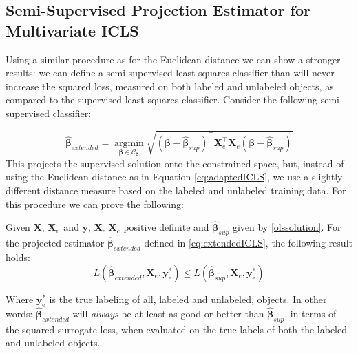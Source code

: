 \documentclass{llncs}
\newcommand{\Xe}{\mathbf{X}_e  }
\newcommand{\XeT}{\mathbf{X}_e^{\top}}
\begin{document}
\subsection{Semi-Supervised Projection Estimator for Multivariate ICLS}

Using a similar procedure as for the Euclidean distance we can show a stronger results: we can define a semi-supervised least squares classifier than will never increase the squared loss, measured on both labeled and unlabeled objects, as compared to the supervised least squares classifier. Consider the following semi-supervised classifier:

\begin{equation} \label{eq:extendedICLS}
\boldsymbol{\hat{\beta}}_{extended} = \operatorname*{argmin}_{\boldsymbol{\beta} \in \mathcal{C}_{\boldsymbol{\beta}}} \sqrt{(\boldsymbol{\beta}-\boldsymbol{\hat{\beta}}_{sup})^{\top} \XeT \Xe (\boldsymbol{\beta}-\boldsymbol{\hat{\beta}}_{sup})}
\end{equation}
This projects the supervised solution onto the constrained space, but, instead of using the Euclidean distance as in Equation \eqref{eq:adaptedICLS}, we use a slightly different distance measure based on the labeled and unlabeled training data. For this procedure we can prove the following:
\begin{theorem}
\label{th:robustness}
Given $\mathbf{X}$, $\mathbf{X}_\mathrm{u}$ and $\mathbf{y}$, $\Xe^\top \Xe$ positive definite and $\boldsymbol{\hat{\beta}}_{sup}$ given by \eqref{olssolution}. For the projected estimator $\boldsymbol{\hat{\beta}}_{extended}$ defined in \eqref{eq:extendedICLS}, the following result holds:
$$L(\boldsymbol{\hat{\beta}}_{extended},\Xe,\mathbf{y}_\mathrm{e}^{\ast}) \leq L(\boldsymbol{\hat{\beta}}_{sup},\Xe,\mathbf{y}_\mathrm{e}^{\ast}) $$
\end{theorem}
Where $\mathbf{y}_\text{e}^\ast$ is the true labeling of all, labeled and unlabeled, objects. In other words: $\boldsymbol{\hat{\beta}}_{extended}$ will \emph{always} be at least as good or better than $\boldsymbol{\hat{\beta}}_{sup}$, in terms of the squared surrogate loss, when evaluated on the true labels of both the labeled and unlabeled objects.
\end{document}
